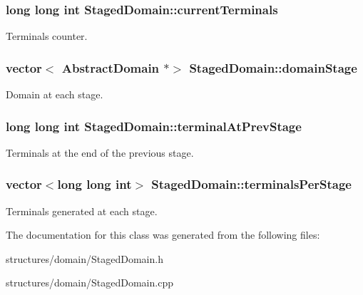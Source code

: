 \subsubsection[{\texorpdfstring{current\+Terminals}{currentTerminals}}]{\setlength{\rightskip}{0pt plus 5cm}long long int Staged\+Domain\+::current\+Terminals\hspace{0.3cm}{\ttfamily [private]}}\hypertarget{class_staged_domain_a8383f99269b421f85b89c3aa847f91ce}{}\label{class_staged_domain_a8383f99269b421f85b89c3aa847f91ce}
Terminals counter. 
\subsubsection[{\texorpdfstring{domain\+Stage}{domainStage}}]{\setlength{\rightskip}{0pt plus 5cm}vector$<$ {\bf Abstract\+Domain} $\ast$$>$ Staged\+Domain\+::domain\+Stage\hspace{0.3cm}{\ttfamily [private]}}\hypertarget{class_staged_domain_a3372c80d0c3bff5255c0d4a7bbce3647}{}\label{class_staged_domain_a3372c80d0c3bff5255c0d4a7bbce3647}
Domain at each stage. 
\subsubsection[{\texorpdfstring{terminal\+At\+Prev\+Stage}{terminalAtPrevStage}}]{\setlength{\rightskip}{0pt plus 5cm}long long int Staged\+Domain\+::terminal\+At\+Prev\+Stage\hspace{0.3cm}{\ttfamily [private]}}\hypertarget{class_staged_domain_a94b7ffac4fc6e07fc14061cdf68475b7}{}\label{class_staged_domain_a94b7ffac4fc6e07fc14061cdf68475b7}
Terminals at the end of the previous stage. 
\subsubsection[{\texorpdfstring{terminals\+Per\+Stage}{terminalsPerStage}}]{\setlength{\rightskip}{0pt plus 5cm}vector$<$long long int$>$ Staged\+Domain\+::terminals\+Per\+Stage\hspace{0.3cm}{\ttfamily [private]}}\hypertarget{class_staged_domain_a8ca1e0466a1ba6563cbe103ac4499364}{}\label{class_staged_domain_a8ca1e0466a1ba6563cbe103ac4499364}
Terminals generated at each stage. 

The documentation for this class was generated from the following files\+:\begin{DoxyCompactItemize}
\item 
structures/domain/Staged\+Domain.\+h\item 
structures/domain/Staged\+Domain.\+cpp\end{DoxyCompactItemize}
